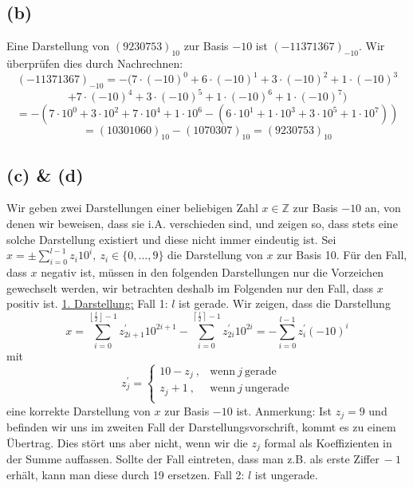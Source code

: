 \documentclass[a4paper, 11pt]{scrartcl}
\theoremstyle{dotless}
\newcommand{\floor}[1]{\left\lfloor #1\right\rfloor}
\newcommand{\ceil}[1]{\left\lceil #1\right\rceil}
\begin{document}
	\subsection*{(b)}
		Eine Darstellung von $(9230753)_{10}$ zur Basis $-10$ ist $(-11371367)_{-10}$. Wir überprüfen dies durch Nachrechnen:
		$$(-11371367)_{-10}=-(7\cdot (-10)^0+6\cdot (-10)^1+3\cdot (-10)^2+1\cdot (-10)^3$$$$+7\cdot (-10)^4+3\cdot (-10)^5+1\cdot (-10)^6+1\cdot (-10)^7)$$
		$$=-(7\cdot 10^0+3\cdot 10^2+7\cdot 10^4+1\cdot 10^6-(6\cdot 10^1+1\cdot 10^3+3\cdot 10^5+1\cdot 10^7))$$
		$$=(10301060)_{10}-(1070307)_{10}=(9230753)_{10}$$
	\subsection*{(c) \& (d)}
		Wir geben zwei Darstellungen einer beliebigen Zahl $x\in \mathbb{Z}$ zur Basis $-10$ an, von denen wir beweisen, dass sie i.A. verschieden sind, und zeigen so, dass stets eine solche Darstellung existiert und diese nicht immer eindeutig ist.\newline
		Sei $x=\pm\sum_{i=0}^{l-1}z_i10^i,~z_i\in \{0,\dots ,9\}$ die Darstellung von $x$ zur Basis 10. Für den Fall, dass $x$ negativ ist, müssen in den folgenden Darstellungen nur die Vorzeichen gewechselt werden, wir betrachten deshalb im Folgenden nur den Fall, dass $x$ positiv ist.\newline
		\underline{1. Darstellung:}\newline
		Fall 1: $l$ ist gerade.\newline
		Wir zeigen, dass die Darstellung
		$$x=\sum_{i=0}^{\floor{\frac{l}{2}}-1}z_{2i+1}^{\prime} 10^{2i+1}-\sum_{i=0}^{\ceil{\frac{l}{2}}-1}z_{2i}^{\prime} 10^{2i}=-\sum_{i=0}^{l-1}z_{i}^{\prime} (-10)^{i}$$
		mit
		$$z_j^{\prime}=\left\{\begin{array}{ll}
		10-z_j~,& \text{wenn}~j~ \text{gerade}\\
		z_j+1~,&\text{wenn}~j~ \text{ungerade}\\
		\end{array}\right.$$
		eine korrekte Darstellung von $x$ zur Basis $-10$ ist. Anmerkung: Ist $z_j=9$ und befinden wir uns im zweiten Fall der Darstellungsvorschrift, kommt es zu einem \glqq Übertrag\grqq. Dies stört uns aber nicht, wenn wir die $z_j$ formal als Koeffizienten in der Summe auffassen. Sollte der Fall eintreten, dass man z.B. als erste \glqq Ziffer\grqq $~-1$ erhält, kann man diese durch 19 ersetzen.\newline
		Fall 2: $l$ ist ungerade.\newline
\end{document}
